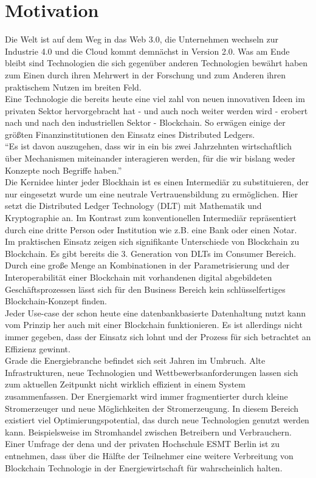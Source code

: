 \section{Motivation}
Die Welt ist auf dem Weg in das Web 3.0, die Unternehmen wechseln zur Industrie 4.0 und die Cloud kommt demnächst in Version 2.0.
Was am Ende bleibt sind Technologien die sich gegenüber anderen Technologien bewährt haben zum Einen durch ihren Mehrwert in der Forschung und zum Anderen ihren praktischem Nutzen im breiten Feld.\\
Eine Technologie die bereits heute eine viel zahl von neuen innovativen Ideen im privaten Sektor hervorgebracht hat  - und auch noch weiter werden wird - erobert nach und nach den industriellen Sektor - Blockchain. So erwägen einige der größten Finanzinstitutionen den Einsatz eines Distributed Ledgers.\\

“Es ist davon auszugehen, dass wir in ein bis zwei Jahrzehnten wirtschaftlich über Mechanismen miteinander interagieren werden, für die wir bislang weder Konzepte noch Begriffe haben.”\cite[S.~92]{Platzer2014}\\

Die Kernidee hinter jeder Blockhain ist es einen Intermediär zu substituieren, der nur eingesetzt wurde um eine neutrale Vertrauensbildung zu ermöglichen. Hier setzt die Distributed Ledger Technology (DLT) mit Mathematik und Kryptographie an. Im Kontrast zum konventionellen Intermediär repräsentiert durch eine dritte Person oder Institution wie z.B. eine Bank oder einen Notar.\\
Im praktischen Einsatz zeigen sich signifikante Unterschiede von Blockchain zu Blockchain. Es gibt bereits die 3. Generation von DLTs im Consumer Bereich. Durch eine große Menge an Kombinationen in der Parametrisierung und der Interoperabilität einer Blockchain mit vorhandenen digital abgebildeten Geschäftsprozessen lässt sich für den Business Bereich kein schlüsselfertiges Blockchain-Konzept finden.\\

Jeder Use-case der schon heute eine datenbankbasierte Datenhaltung nutzt kann vom Prinzip her auch mit einer Blockchain funktionieren. Es ist allerdings nicht immer gegeben, dass der Einsatz sich lohnt und der Prozess für sich betrachtet an Effizienz gewinnt.\\

Grade die Energiebranche befindet sich seit Jahren im Umbruch. Alte Infrastrukturen, neue Technologien und Wettbewerbsanforderungen lassen sich zum aktuellen Zeitpunkt nicht wirklich effizient in einem System zusammenfassen. Der Energiemarkt wird immer fragmentierter durch kleine Stromerzeuger und neue Möglichkeiten der Stromerzeugung. In diesem Bereich existiert viel Optimierungspotential, das durch neue Technologien genutzt werden kann. Beispielsweise im Stromhandel zwischen Betreibern und Verbrauchern. Einer Umfrage der dena und der privaten Hochschule ESMT Berlin ist zu entnehmen, dass über die Hälfte der Teilnehmer eine weitere Verbreitung von Blockchain Technologie in der Energiewirtschaft für wahrscheinlich halten.\cite[Vgl.]{EnergieAgentur2016}